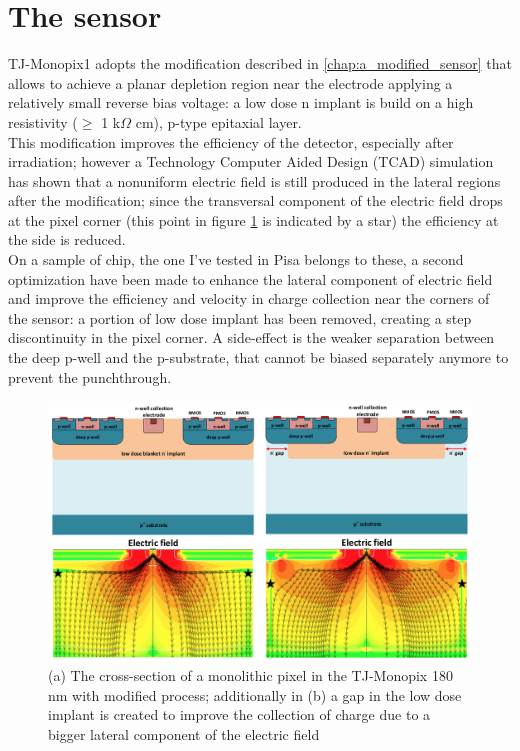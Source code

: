 \section{The sensor}
    TJ-Monopix1 adopts the modification described in \ref{chap:a_modified_sensor} that allows to achieve a planar depletion region near the electrode applying a relatively small reverse bias voltage: a low dose n implant is build on a high resistivity ($\geq $ 1 k$\Omega$ cm), p-type epitaxial layer.\\
    This modification improves the efficiency of the detector, especially after irradiation\cite{}; however a Technology Computer Aided Design (TCAD) simulation has shown that a nonuniform electric field is still produced in the lateral regions after the modification; since the transversal component of the electric field drops at the pixel corner (this point in figure \ref{fig:Monopix1_section_scheme} is indicated by a star) the efficiency at the side is reduced. \\
    On a sample of chip, the one I've tested in Pisa belongs to these, a second optimization have been made to enhance the lateral component of electric field and improve the efficiency and velocity in charge collection near the corners of the sensor: a portion of low dose implant has been removed, creating a step discontinuity in the pixel corner. 
    A side-effect is the weaker separation between the deep p-well and the p-substrate, that cannot be biased separately anymore to prevent the punchthrough. 
        \begin{figure}[h!]
        \centering
        \includegraphics[width=.9\linewidth]{figures/Monopix1/Monopix1_section_scheme.png}
        \caption{(a) The cross-section of a monolithic pixel in the TJ-Monopix 180 nm with modified process; additionally in (b) a gap in the low dose implant is created to improve the collection of charge due to a bigger lateral component of the electric field}
        \label{fig:Monopix1_section_scheme}
    \end{figure}

